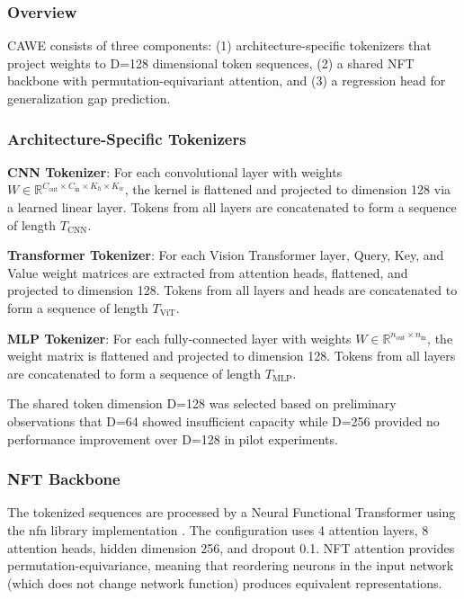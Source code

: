 
\subsubsection{Overview}

CAWE consists of three components: (1) architecture-specific tokenizers that project weights to D=128 dimensional token sequences, (2) a shared NFT backbone with permutation-equivariant attention, and (3) a regression head for generalization gap prediction.

\subsubsection{Architecture-Specific Tokenizers}

\textbf{CNN Tokenizer}: For each convolutional layer with weights $W \in \mathbb{R}^{C_\text{out} \times C_\text{in} \times K_h \times K_w}$, the kernel is flattened and projected to dimension 128 via a learned linear layer. Tokens from all layers are concatenated to form a sequence of length $T_\text{CNN}$.

\textbf{Transformer Tokenizer}: For each Vision Transformer layer, Query, Key, and Value weight matrices are extracted from attention heads, flattened, and projected to dimension 128. Tokens from all layers and heads are concatenated to form a sequence of length $T_\text{ViT}$.

\textbf{MLP Tokenizer}: For each fully-connected layer with weights $W \in \mathbb{R}^{n_\text{out} \times n_\text{in}}$, the weight matrix is flattened and projected to dimension 128. Tokens from all layers are concatenated to form a sequence of length $T_\text{MLP}$.

The shared token dimension D=128 was selected based on preliminary observations that D=64 showed insufficient capacity while D=256 provided no performance improvement over D=128 in pilot experiments.

\subsubsection{NFT Backbone}

The tokenized sequences are processed by a Neural Functional Transformer using the nfn library implementation \citep{zhou2023meta}. The configuration uses 4 attention layers, 8 attention heads, hidden dimension 256, and dropout 0.1. NFT attention provides permutation-equivariance, meaning that reordering neurons in the input network (which does not change network function) produces equivalent representations.

